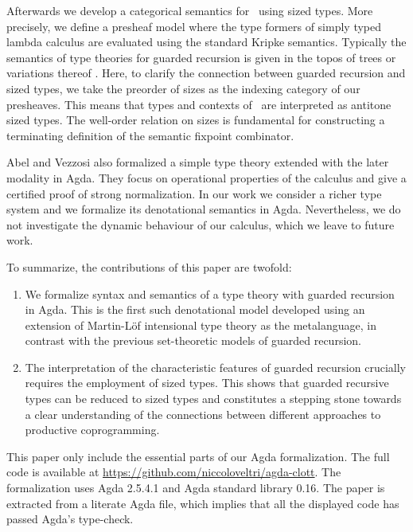 Afterwards we develop a categorical semantics
for \GTT\ using sized types. More precisely, we define a presheaf
model where the type formers of simply typed lambda calculus are
evaluated using the standard Kripke semantics. Typically the semantics
of type theories for guarded recursion is given in the topos of
trees or variations thereof \cite{BMSS-synthetic,MannaaM18,Mogelberg14}.
Here, to clarify the connection between guarded recursion and
sized types, we take the preorder of sizes as the indexing
category of our presheaves. This means that types and contexts of \GTT\ are
interpreted as antitone sized types. 
The well-order relation on sizes is fundamental for constructing a
terminating definition of the semantic fixpoint combinator. 

Abel and Vezzosi \cite{AbelV14} also formalized a simple type theory
extended with the later modality in Agda. They focus on operational
properties of the calculus and give a certified proof of strong
normalization. In our work we consider a richer type system and we
formalize its denotational semantics in Agda. Nevertheless, we do not
investigate the dynamic behaviour of our calculus, which we leave to
future work.


To summarize, the contributions of this paper are twofold:
\begin{enumerate}
  \item We formalize syntax and semantics of a type theory with
    guarded recursion in Agda. This is the first such denotational model developed using an extension of Martin-L\"of intensional
    type theory as the metalanguage, in contrast with the previous
    set-theoretic models of guarded recursion.
\item The interpretation of the characteristic features of guarded
  recursion crucially requires the employment of sized types. This shows that
  guarded recursive types can be reduced to sized types and
  constitutes a stepping stone towards a clear understanding of  the connections
  between different approaches to productive coprogramming.
\end{enumerate}

This paper only include the essential parts of our Agda
formalization. The full code is available at
\url{https://github.com/niccoloveltri/agda-clott}. The formalization
uses Agda 2.5.4.1 and Agda standard library 0.16. The paper is
extracted from a literate Agda file, which implies that all the
displayed code has passed Agda's type-check.

